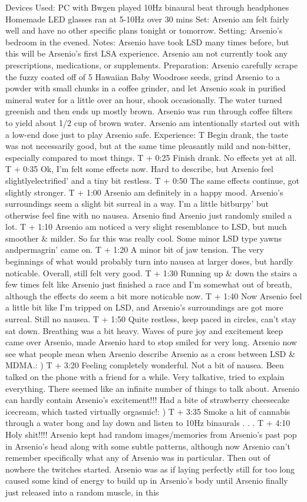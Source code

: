 \documentclass[12pt]{book}
\begin{document}
Devices Used: PC with Bwgen played 10Hz binaural beat through headphones Homemade LED glasses ran at 5-10Hz over 30 mins Set: Arsenio am felt fairly well and have no other specific plans tonight or tomorrow. Setting: Arsenio's bedroom in the evened. Notes: Arsenio have took LSD many times before, but this will be Arsenio's first LSA experience. Arsenio am not currently took any prescriptions, medications, or supplements. Preparation: Arsenio carefully scrape the fuzzy coated off of 5 Hawaiian Baby Woodrose seeds, grind Arsenio to a powder with small chunks in a coffee grinder, and let Arsenio soak in purified mineral water for a little over an hour, shook occasionally. The water turned greenish and then ends up mostly brown. Arsenio was run through coffee filters to yield about 1/2 cup of brown water. Arsenio am intentionally started out with a low-end dose just to play Arsenio safe. Experience: T Begin drank, the taste was not necessarily good, but at the same time pleasantly mild and non-bitter, especially compared to most things. T + 0:25 Finish drank. No effects yet at all. T + 0:35 Ok, I'm felt some effects now. Hard to describe, but Arsenio feel slightlyelectrified' and a tiny bit restless. T + 0:50 The same effects continue, got slightly stronger. T + 1:00 Arsenio am definitely in a happy mood. Arsenio's surroundings seem a slight bit surreal in a way. I'm a little bitburpy' but otherwise feel fine with no nausea. Arsenio find Arsenio just randomly smiled a lot. T + 1:10 Arsenio am noticed a very slight resemblance to LSD, but much smoother \& milder. So far this was really cool. Some minor LSD type yawns andpermagrin' came on. T + 1:20 A minor bit of jaw tension. The very beginnings of what would probably turn into nausea at larger doses, but hardly noticable. Overall, still felt very good. T + 1:30 Running up \& down the stairs a few times felt like Arsenio just finished a race and I'm somewhat out of breath, although the effects do seem a bit more noticable now. T + 1:40 Now Arsenio feel a little bit like I'm tripped on LSD, and Arsenio's surroundings are got more surreal. Still no nausea. T + 1:50 Quite restless, keep paced in circles, can't stay sat down. Breathing was a bit heavy. Waves of pure joy and excitement keep came over Arsenio, made Arsenio hard to stop smiled for very long. Arsenio now see what people mean when Arsenio describe Arsenio as a cross between LSD \& MDMA.: ) T + 3:20 Feeling completely wonderful. Not a bit of nausea. Been talked on the phone with a friend for a while. Very talkative, tried to explain everything. There seemed like an infinite number of things to talk about. Arsenio can hardly contain Arsenio's excitement!!! Had a bite of strawberry cheesecake icecream, which tasted virtually orgasmic!: ) T + 3:35 Smoke a hit of cannabis through a water bong and lay down and listen to 10Hz binaurals . . .  T + 4:10 Holy shit!!!! Arsenio kept had random images/memories from Arsenio's past pop in Arsenio's head along with some subtle patterns, although now Arsenio can't remember specifically what any of Arsenio was in particular. Then out of nowhere the twitches started. Arsenio was as if laying perfectly still for too long caused some kind of energy to build up in Arsenio's body until Arsenio finally just released into a random muscle, in this 
\end{document}
